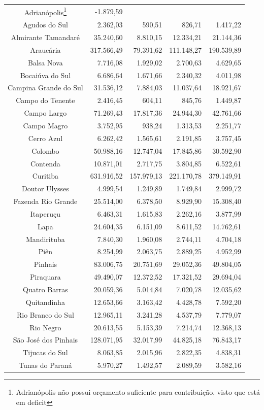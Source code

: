 \begin{center}
\begin{longtable}[c]{| c | r | r | r | r |}
			Adrianópolis\footnote{Adrianópolis não possui orçamento suficiente para contribuição, visto que está em deficit} & -1.879,59 &  &  & \\
			Agudos do Sul & 2.362,03 & 590,51 & 826,71 & 1.417,22 \\
			Almirante Tamandaré & 35.240,60 & 8.810,15 & 12.334,21 & 21.144,36 \\
			Araucária & 317.566,49 & 79.391,62 & 111.148,27 & 190.539,89 \\
			Balsa Nova & 7.716,08 & 1.929,02 & 2.700,63 & 4.629,65 \\
			Bocaiúva do Sul & 6.686,64 & 1.671,66 & 2.340,32 & 4.011,98 \\
			Campina Grande do Sul & 31.536,12 & 7.884,03 & 11.037,64 & 18.921,67 \\
			Campo do Tenente & 2.416,45 & 604,11 & 845,76 & 1.449,87 \\
			Campo Largo & 71.269,43 & 17.817,36 & 24.944,30 & 42.761,66 \\
			Campo Magro & 3.752,95 & 938,24 & 1.313,53 & 2.251,77 \\
			Cerro Azul & 6.262,42 & 1.565,61 & 2.191,85 & 3.757,45 \\
			Colombo & 50.988,16 & 12.747,04 & 17.845,86 & 30.592,90 \\
			Contenda & 10.871,01 & 2.717,75 & 3.804,85 & 6.522,61 \\
			Curitiba & 631.916,52 & 157.979,13 & 221.170,78 & 379.149,91 \\
			Doutor Ulysses & 4.999,54 & 1.249,89 & 1.749,84 & 2.999,72 \\
			Fazenda Rio Grande & 25.514,00 & 6.378,50 & 8.929,90 & 15.308,40 \\
			Itaperuçu & 6.463,31 & 1.615,83 & 2.262,16 & 3.877,99 \\
			Lapa & 24.604,35 & 6.151,09 & 8.611,52 & 14.762,61 \\
			Mandirituba & 7.840,30 & 1.960,08 & 2.744,11 & 4.704,18 \\
			Piên & 8.254,99 & 2.063,75 & 2.889,25 & 4.952,99 \\
			Pinhais & 83.006,75 & 20.751,69 & 29.052,36 & 49.804,05 \\
			Piraquara & 49.490,07 & 12.372,52 & 17.321,52 & 29.694,04 \\
			Quatro Barras & 20.059,36 & 5.014,84 & 7.020,78 & 12.035,62 \\
			Quitandinha & 12.653,66 & 3.163,42 & 4.428,78 & 7.592,20 \\
			Rio Branco do Sul & 12.965,11 & 3.241,28 & 4.537,79 & 7.779,07 \\
			Rio Negro & 20.613,55 & 5.153,39 & 7.214,74 & 12.368,13 \\
			São José dos Pinhais & 128.071,95 & 32.017,99 & 44.825,18 & 76.843,17 \\
			Tijucas do Sul & 8.063,85 & 2.015,96 & 2.822,35 & 4.838,31 \\
			Tunas do Paraná & 5.970,27 & 1.492,57 & 2.089,59 & 3.582,16 \\
		\end{longtable}
	\end{center}
	
